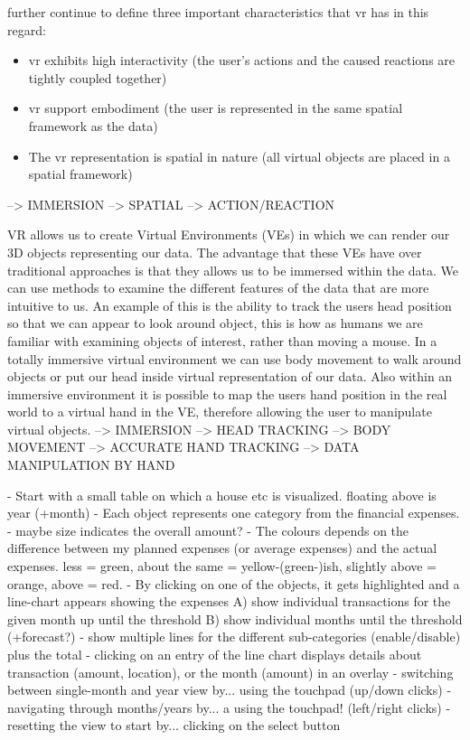 \cite{Stone1994} further continue to define three important characteristics that \gls{vr} has in this regard:
\begin{itemize}[noitemsep,nolistsep]
	\item \gls{vr} exhibits high interactivity (the user's actions and the caused reactions are tightly coupled together)
	\item \gls{vr} support embodiment (the user is represented  in the same spatial framework as the data)
	\item The \gls{vr} representation is spatial in nature (all virtual objects are placed in a spatial framework)
\end{itemize}
--> IMMERSION
--> SPATIAL
--> ACTION/REACTION

VR allows us to create Virtual Environments (VEs) in which we can render our 3D objects representing our data. The advantage that these VEs have over traditional approaches is that they allows us to be immersed within the data. We can use methods to examine the different features of the data that are more intuitive to us. An example of this is the ability to track the users head position so that we can appear to look around object, this is how as humans we are familiar with examining objects of interest, rather than moving a mouse. In a totally immersive virtual environment we can use body movement to walk around objects or put our head inside virtual representation of our data. Also within an immersive environment it is possible to map the users hand position in the real world to a virtual hand in the VE, therefore allowing the user to manipulate virtual objects.
\cite{Jamieson2007}
--> IMMERSION
--> HEAD TRACKING
--> BODY MOVEMENT
--> ACCURATE HAND TRACKING
--> DATA MANIPULATION BY HAND



- Start with a small table on which a house etc is visualized. floating above is year (+month)
- Each object represents one category from the financial expenses.
- maybe size indicates the overall amount?
- The colours depends on the difference between my planned expenses (or average expenses) and the actual expenses. less = green, about the same = yellow-(green-)ish, slightly above = orange, above = red.
- By clicking on one of the objects, it gets highlighted and a line-chart appears showing the expenses
   A) show individual transactions for the given month up until the threshold
   B) show individual months until the threshold (+forecast?)
- show multiple lines for the different sub-categories (enable/disable) plus the total
- clicking on an entry of the line chart displays details about transaction (amount, location), or the month (amount) in an overlay
- switching between single-month and year view by... using the touchpad (up/down clicks)
- navigating through months/years by... a using the touchpad! (left/right clicks)
- resetting the view to start by... clicking on the select button


